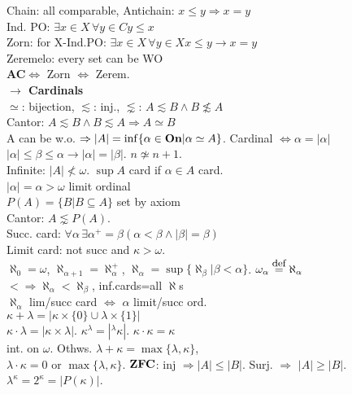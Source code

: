 \documentclass[9pt]{article}
\newcommand{\class}[1]{{\bf #1}}
\newcommand{\eqdef}{\overset{\mbox{\small{def}}}{=}}
\newcommand{\mytitle}[1]{ {\bf $\rightarrow$ #1}\\}
\newcommand{\On}{\class{On}}
\begin{document}
\begin{multicols*}{2}
Chain: all comparable, Antichain: $x\leqslant y\Rightarrow x=y$\\
Ind. PO: $\exists x\in X\,\forall y\in C y\leqslant x$\\
Zorn: for X-Ind.PO: $\exists x\in X\,\forall y\in X x\leqslant y\rightarrow x=y$\\
Zeremelo: every set can be WO\\
\class{AC}$\Leftrightarrow$ Zorn $\Leftrightarrow$ Zerem.\\
\mytitle{Cardinals}
$\simeq$: bijection, $\lesssim$: inj., $\lnsim$: $A\lesssim B\wedge B\not\lesssim A$\\
Cantor: $A\lesssim B\wedge B\lesssim A\Rightarrow A\simeq B$\\
A can be w.o. $\Rightarrow|A|=\inf\{\alpha\in \On|\alpha\simeq A\}$. Cardinal $\Leftrightarrow \alpha=|\alpha|$\\
$|\alpha|\leqslant \beta\leqslant \alpha\rightarrow |\alpha|=|\beta|$. $n\not\simeq n+1$.\\
Infinite: $|A|\not<\omega$. $\sup A$ card if $\alpha\in A$ card.\\
$|\alpha|=\alpha>\omega$ limit ordinal\\
$P(A)=\{B|B\subseteq A\}$ set by axiom\\
Cantor: $A\lnsim P(A)$.\\
Succ. card: $\forall\alpha\,\exists\alpha^+=\beta(\alpha<\beta\wedge|\beta|=\beta)$\\
Limit card: not succ and $\kappa>\omega$.\\
$\aleph_0=\omega$, $\aleph_{\alpha+1}=\aleph_{\alpha}^+$, $\aleph_\alpha=\sup\{\aleph_{\beta}|\beta<\alpha\}$. $\omega_\alpha\eqdef\aleph_\alpha$\\
$<\Rightarrow\aleph_\alpha<\aleph_\beta$, inf.cards=all $\aleph$s\\
$\aleph_\alpha$ lim/succ card $\Leftrightarrow$ $\alpha$ limit/succ ord.\\
$\kappa+\lambda=|\kappa\times\{0\}\cup\lambda\times\{1\}|$\\
$\kappa\cdot\lambda=|\kappa\times\lambda|$. $\kappa^\lambda=|^\lambda\kappa|$. $\kappa\cdot\kappa=\kappa$\\
int. on $\omega$. Othws. $\lambda+\kappa=\max\{\lambda,\kappa\}$,\\
$\lambda\cdot \kappa=0$ or $\max\{\lambda,\kappa\}$.
$\class{ZFC}$: inj $\Rightarrow |A|\leqslant |B|$. Surj. $\Rightarrow$ $|A|\geqslant |B|$.\\
$\lambda^\kappa=2^\kappa=|P(\kappa)|$.\\

\end{multicols*}
\end{document}
